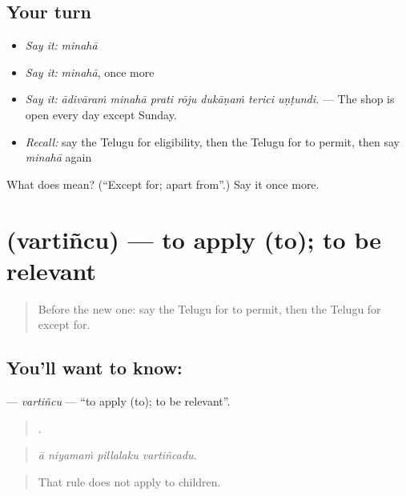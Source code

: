\subsection*{Your turn}
\begin{itemize}
\raggedright
  \item \emph{Say it:} \emph{minahā}
  \item \emph{Say it:} \emph{minahā}, once more
  \item \emph{Say it:} \emph{ādivāraṁ minahā prati rōju dukāṇaṁ terici uṇṭundi.} — The shop is open every day except Sunday.
  \item \emph{Recall:} say the Telugu for eligibility, then the Telugu for to permit, then say \emph{minahā} again
\end{itemize}

\begin{tcolorbox}[breakable,colback=teal!4,colframe=teal!35!black,title={Before you move on}]
What does  mean? (\textquotedblleft{}Except for; apart from\textquotedblright{}.) Say it once more.
\end{tcolorbox}
\section[\texorpdfstring{\te{వర్తించు} (vartiñcu)}{వర్తించు (vartiñcu)}]{ (vartiñcu) — to apply (to); to be relevant}

\label{lesson:TE-C417-vartincu}



\begin{quote}
Before the new one: say the Telugu for to permit, then the Telugu for except for.
\end{quote}

\subsection*{You'll want to know: }
\textbf{} — \emph{vartiñcu} — \textquotedblleft{}to apply (to); to be relevant\textquotedblright{}.

\begin{quote}
   .
\end{quote}

\begin{quote}
\emph{ā niyamaṁ pillalaku vartiñcadu.}
\end{quote}

\begin{quote}
That rule does not apply to children.
\end{quote}

